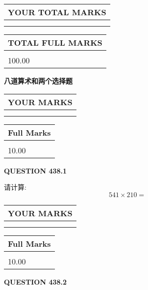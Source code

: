 \documentclass{ctexart}
\begin{document}
   
\vspace{0.2in}\noindent\begin{tabular}{|l|}
\hline
YOUR TOTAL MARKS  \\
\hline
 \\ 
 \\ 
\hline
\end{tabular}
\hspace{0.05in} \begin{tabular}{|l|}
\hline
TOTAL FULL MARKS  \\
\hline
 \\ 
100.00 \\
\hline
\end{tabular}
   
   
 \vspace{0.2in}
{\LARGE {\textbf{ 八道算术和两个选择题}}}
   
   
  
\vspace{0.2in}
  
\noindent\begin{tabular}{|l|}
\hline
 YOUR MARKS  \\
\hline
 \\ 
 \\ 
\hline
\end{tabular}
\hspace{0.05in} \begin{tabular}{|l|}
\hline
 Full Marks  \\
\hline
 \\ 
10.00 \\
\hline
\end{tabular}
{\textbf{\Large{QUESTION
438.1 
}}}
  
  
 
请计算:
\begin{equation}
541  \times    %
210 = \nonumber
\end{equation}
 

 

 
  
\vspace{0.2in}
  
\noindent\begin{tabular}{|l|}
\hline
 YOUR MARKS  \\
\hline
 \\ 
 \\ 
\hline
\end{tabular}
\hspace{0.05in} \begin{tabular}{|l|}
\hline
 Full Marks  \\
\hline
 \\ 
10.00 \\
\hline
\end{tabular}
{\textbf{\Large{QUESTION
438.2 
}}}
  
\end{document}
